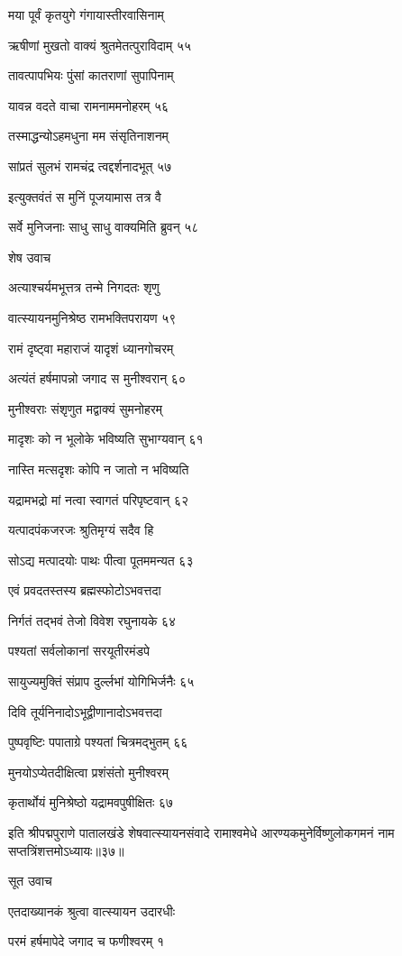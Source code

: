 मया पूर्वं कृतयुगे गंगायास्तीरवासिनाम्

ऋषीणां मुखतो वाक्यं श्रुतमेतत्पुराविदाम् ५५

तावत्पापभियः पुंसां कातराणां सुपापिनाम्

यावन्न वदते वाचा रामनाममनोहरम् ५६

तस्माद्धन्योऽहमधुना मम संसृतिनाशनम्

सांप्रतं सुलभं रामचंद्र त्वद्दर्शनादभूत् ५७

इत्युक्तवंतं स मुनिं पूजयामास तत्र वै

सर्वे मुनिजनाः साधु साधु वाक्यमिति ब्रुवन् ५८

शेष उवाच

अत्याश्चर्यमभूत्तत्र तन्मे निगदतः शृणु

वात्स्यायनमुनिश्रेष्ठ रामभक्तिपरायण ५९

रामं दृष्ट्वा महाराजं यादृशं ध्यानगोचरम्

अत्यंतं हर्षमापन्नो जगाद स मुनीश्वरान् ६०

मुनीश्वराः संशृणुत मद्वाक्यं सुमनोहरम्

मादृशः को न भूलोके भविष्यति सुभाग्यवान् ६१

नास्ति मत्सदृशः कोपि न जातो न भविष्यति

यद्रामभद्रो मां नत्वा स्वागतं परिपृष्टवान् ६२

यत्पादपंकजरजः श्रुतिमृग्यं सदैव हि

सोऽद्य मत्पादयोः पाथः पीत्वा पूतममन्यत ६३

एवं प्रवदतस्तस्य ब्रह्मस्फोटोऽभवत्तदा

निर्गतं तद्भवं तेजो विवेश रघुनायके ६४

पश्यतां सर्वलोकानां सरयूतीरमंडपे

सायुज्यमुक्तिं संप्राप दुर्ल्लभां योगिभिर्जनैः ६५

दिवि तूर्यनिनादोऽभूद्वीणानादोऽभवत्तदा

पुष्पवृष्टिः पपाताग्रे पश्यतां चित्रमद्भुतम् ६६

मुनयोऽप्येतदीक्षित्वा प्रशंसंतो मुनीश्वरम्

कृतार्थोयं मुनिश्रेष्ठो यद्रामवपुषीक्षितः ६७

इति श्रीपद्मपुराणे पातालखंडे शेषवात्स्यायनसंवादे रामाश्वमेधे आरण्यकमुनेर्विष्णुलोकगमनं नाम सप्तत्रिंशत्तमोऽध्यायः॥३७॥


सूत उवाच

एतदाख्यानकं श्रुत्वा वात्स्यायन उदारधीः

परमं हर्षमापेदे जगाद च फणीश्वरम् १

